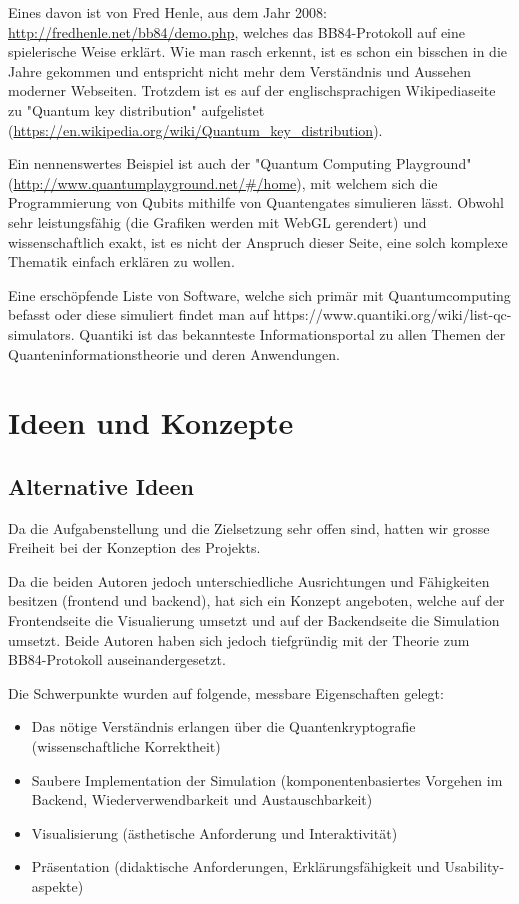 \documentclass[a4paper,10.2pt,pdftex]{scrartcl}%
\begin{document}
Eines davon ist von Fred Henle, aus dem Jahr 2008: \url{http://fredhenle.net/bb84/demo.php}, welches das BB84-Protokoll auf eine spielerische Weise erklärt. Wie man rasch erkennt, ist es schon ein bisschen in die Jahre gekommen und entspricht nicht mehr dem Verständnis und Aussehen moderner Webseiten. Trotzdem ist es auf der englischsprachigen Wikipediaseite zu "Quantum key distribution" aufgelistet (\url{https://en.wikipedia.org/wiki/Quantum_key_distribution}).

Ein nennenswertes Beispiel ist auch der "Quantum Computing Playground" (\url{http://www.quantumplayground.net/#/home}), mit welchem sich die Programmierung von Qubits mithilfe von Quantengates simulieren lässt. Obwohl sehr leistungsfähig (die Grafiken werden mit WebGL gerendert) und wissenschaftlich exakt, ist es nicht der Anspruch dieser Seite, eine solch komplexe Thematik einfach erklären zu wollen.

Eine erschöpfende Liste von Software, welche sich primär mit Quantumcomputing befasst oder diese simuliert findet man auf https://www.quantiki.org/wiki/list-qc-simulators. Quantiki ist das bekannteste Informationsportal zu allen Themen der Quanteninformationstheorie und deren Anwendungen.

\section{Ideen und Konzepte}
\subsection{Alternative Ideen}
Da die Aufgabenstellung und die Zielsetzung sehr offen sind, hatten wir grosse Freiheit bei der Konzeption des Projekts.

Da die beiden Autoren jedoch unterschiedliche Ausrichtungen und Fähigkeiten besitzen (frontend und backend), hat sich ein Konzept angeboten, welche auf der Frontendseite die Visualierung umsetzt und auf der Backendseite die Simulation umsetzt. Beide Autoren haben sich jedoch tiefgründig mit der Theorie zum BB84-Protokoll auseinandergesetzt.

Die Schwerpunkte wurden auf folgende, messbare Eigenschaften gelegt:
\begin{itemize}
\item Das nötige Verständnis erlangen über die Quantenkryptografie (wissenschaftliche Korrektheit)
\item Saubere Implementation der Simulation (komponentenbasiertes Vorgehen im Backend, Wiederverwendbarkeit und Austauschbarkeit)
\item Visualisierung (ästhetische Anforderung und Interaktivität)
\item Präsentation (didaktische Anforderungen, Erklärungsfähigkeit und Usability-aspekte) 
\end{itemize}
\end{document}

